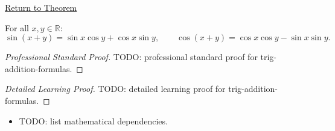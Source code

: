 \newpage
{}
\label{prf:trig-addition-formulas}

\begin{remark*}[Return]
\hyperref[prop:trig-addition-formulas]{Return to Theorem}
\end{remark*}

\begin{theorem*}
For all $x, y \in \mathbb{R}$:
\[
  \sin(x+y) = \sin x \cos y + \cos x \sin y,
  \qquad
  \cos(x+y) = \cos x \cos y - \sin x \sin y.
\]

\smallskip\noindent
\end{theorem*}

\begin{proof}[Professional Standard Proof]
\LRAProofBodyStart
TODO: professional standard proof for trig-addition-formulas.
\end{proof}

\begin{proof}[Detailed Learning Proof]
\LRAProofBodyStart
TODO: detailed learning proof for trig-addition-formulas.
\end{proof}

\begin{remark*}
\end{remark*}

\begin{dependencies}
\begin{itemize}
  \item TODO: list mathematical dependencies.
\end{itemize}
\end{dependencies}

\clearpage
